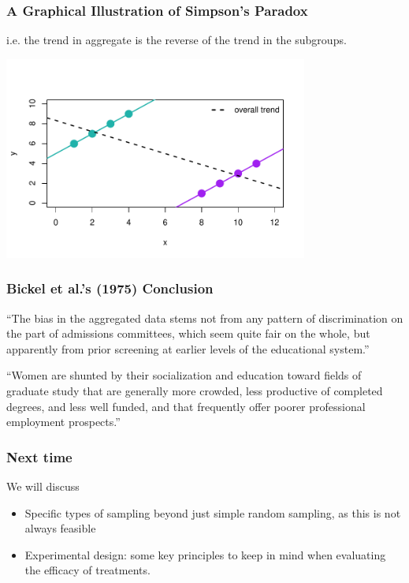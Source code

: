 \documentclass[handout]{beamer}
\newcommand{\blue}[1]{\textcolor{blue2}{#1}}
\begin{document}
\begin{frame}
\frametitle{A Graphical Illustration of Simpson's Paradox}
i.e. the trend in aggregate is the \blue{reverse} of the trend in the subgroups.
\begin{center}
\includegraphics[width=10cm]{figure/simpsons5.pdf}
\end{center}

\end{frame}



\begin{frame}
\frametitle{Bickel et al.'s (1975) Conclusion}

\pause ``The bias in the aggregated data stems \blue{not from any pattern of discrimination on the part of admissions committees}, which seem quite fair on the whole, but apparently from \blue{prior screening at earlier levels of the educational system}.''

\vspace{0.5cm}

\pause ``Women are shunted by their socialization and education toward fields of graduate study that are generally more crowded, less productive of completed degrees, and less well funded, and that frequently offer poorer professional employment prospects.''

\end{frame}



\begin{frame}
\frametitle{Next time}

We will discuss 
\begin{itemize}
\item Specific types of sampling beyond just \blue{simple random sampling}, as this is not always feasible
\pause\item Experimental design:  some key principles to keep in mind when evaluating the efficacy of treatments. 
\end{itemize}

\end{frame}
\end{document}
